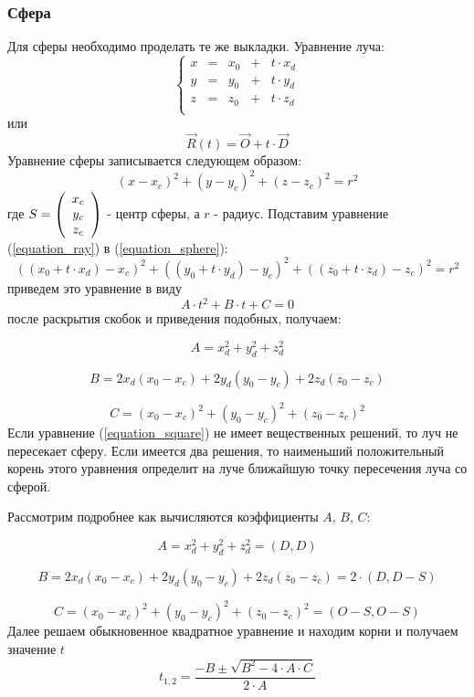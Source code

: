 \subsubsection{Сфера}
Для сферы необходимо проделать те же выкладки.
Уравнение луча:
\begin{equation}
\left\{
\begin{array}{ccccc}
x & = & x_0 & + & t \cdot x_d \\
y & = & y_0 & + & t \cdot y_d \\
z & = & z_0 & + & t \cdot z_d \\
\end{array}
\right.
\label{equation_ray}
\end{equation}
или
$$
\vec{R}(t) = \vec{O} + t \cdot \vec{D}
$$
Уравнение сферы записывается следующем образом:
\begin{equation}
(x-x_c)^2 + (y-y_c)^2 + (z-z_c)^2 = r^2
\label{equation_sphere}
\end{equation}
где $S = \left( \begin{array}{c} x_c \\ y_c \\ z_c \end{array} \right)$ - центр сферы, а $r$ - радиус. Подставим уравнение (\ref{equation_ray}) в (\ref{equation_sphere}):
$$
\left( (x_0 + t \cdot x_d) - x_c \right)^2 + 
\left( (y_0 + t \cdot y_d) - y_c \right)^2 + 
\left( (z_0 + t \cdot z_d) - z_c \right)^2 = r^2
$$
приведем это уравнение в виду
\begin{equation}
A \cdot t^2 + B \cdot t + C = 0
\label{equation_square}
\end{equation}
после раскрытия скобок и приведения подобных, получаем:
\par
$$
A = x^2_d + y^2_d + z^2_d
$$ 
\par
$$
B = 2x_d(x_0 - x_c) + 2y_d(y_0 - y_c)  + 2z_d(z_0 - z_c) 
$$ 
\par
$$
C = (x_0 - x_c)^2 + (y_0 - y_c)^2 + (z_0 - z_c)^2 
$$
Если уравнение (\ref{equation_square}) не имеет вещественных решений, то луч не пересекает сферу. Если имеется два решения, то наименьший положительный корень этого уравнения определит на луче ближайшую точку пересечения луча со сферой.
\par
Рассмотрим подробнее как вычисляются коэффициенты $A$, $B$, $C$:
\par
$$
A = x^2_d + y^2_d + z^2_d = (D, D)
$$ 
\par
$$
B = 2x_d(x_0 - x_c) + 2y_d(y_0 - y_c)  + 2z_d(z_0 - z_c)  = 2 \cdot (D, D - S)
$$ 
\par
$$
C = (x_0 - x_c)^2 + (y_0 - y_c)^2 + (z_0 - z_c)^2 = (O - S, O - S )
$$
Далее решаем обыкновенное квадратное уравнение и находим корни и получаем значение $t$
$$
t_{1,2} = \frac{-B \pm \sqrt{B^2 - 4 \cdot A \cdot C}}{2 \cdot A}
$$

